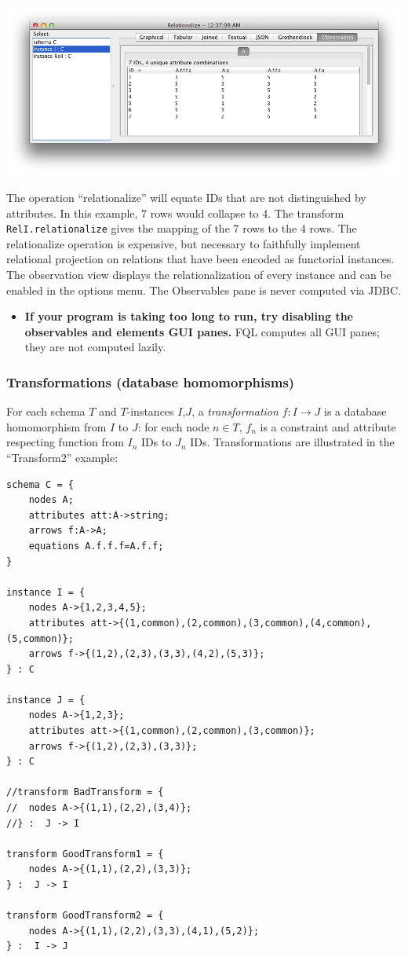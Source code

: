 \documentclass[12pt]{article}
\begin{document}
\begin{center}
\includegraphics[width=6in]{observe}
\end{center}

The operation ``relationalize'' will equate IDs that are not distinguished by attributes.  In this example, 7 rows would collapse to 4. The transform {\tt RelI.relationalize} gives the mapping of the 7 rows to the 4 rows. The relationalize operation is expensive, but necessary to faithfully implement relational projection on relations that have been encoded as functorial instances.  The observation view displays the relationalization of every instance and can be enabled in the options menu.  The Observables pane is never computed via JDBC.

\begin{itemize}
\item {\bf If your program is taking too long to run, try disabling the observables and elements GUI panes.}  FQL computes all GUI panes; they are not computed lazily. 
\end{itemize}

\subsubsection{Transformations (database homomorphisms)}

For each schema $T$ and $T$-instances $I$,$J$, a {\it transformation} $f : I \to J$ is a database homomorphism from $I$ to $J$: for each node $n \in T$, $f_n$ is a constraint and attribute respecting function from $I_n$ IDs to $J_n$ IDs.  Transformations are illustrated in the ``Transform2'' example:
\begin{verbatim}
schema C = {
	nodes A;
	attributes att:A->string;
	arrows f:A->A;
	equations A.f.f.f=A.f.f;
}

instance I = {
	nodes A->{1,2,3,4,5};
	attributes att->{(1,common),(2,common),(3,common),(4,common),(5,common)};
	arrows f->{(1,2),(2,3),(3,3),(4,2),(5,3)};
} : C 

instance J = {
	nodes A->{1,2,3};
	attributes att->{(1,common),(2,common),(3,common)};
	arrows f->{(1,2),(2,3),(3,3)};
} : C 

//transform BadTransform = {
//	nodes A->{(1,1),(2,2),(3,4)};
//} :  J -> I

transform GoodTransform1 = {
	nodes A->{(1,1),(2,2),(3,3)};
} :  J -> I

transform GoodTransform2 = {
	nodes A->{(1,1),(2,2),(3,3),(4,1),(5,2)};
} :  I -> J
\end{verbatim}
\end{document}
